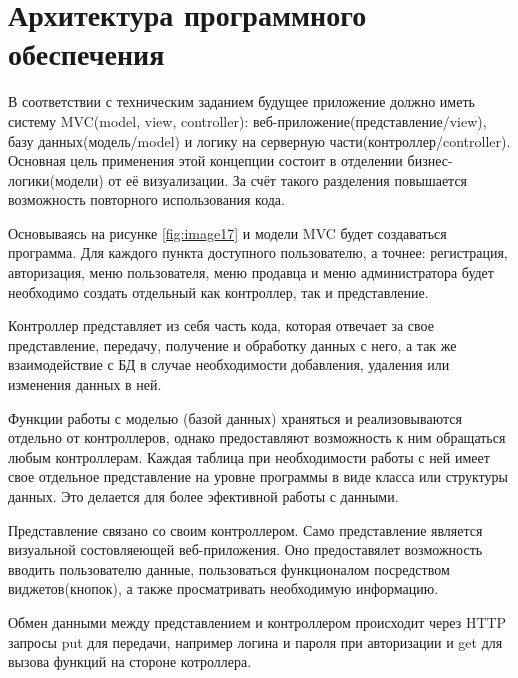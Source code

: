 \newpage

\section{Архитектура программного обеспечения}

\hspace{0cm} В соответствии с техническим заданием будущее приложение должно иметь систему MVC(model, view, controller): веб-приложение(представление/view), базу данных(модель/model) и логику на серверную части(контроллер/controller). Основная цель применения этой концепции состоит в отделении бизнес-логики(модели) от её визуализации. За счёт такого разделения повышается возможность повторного использования кода.

\hspace{0cm} Основываясь на рисунке \ref{fig:image17} и модели MVC будет создаваться программа. Для каждого пункта доступного пользователю, а точнее: регистрация, авторизация, меню пользователя, меню продавца и меню администратора будет необходимо создать отдельный как контроллер, так и представление.

\hspace{0cm} Контроллер представляет из себя часть кода, которая отвечает за свое представление, передачу, получение и обработку данных с него, а так же взаимодействие с БД в случае необходимости добавления, удаления или изменения данных в ней.

\hspace{0cm} Функции работы с моделью (базой данных) храняться и реализовываются отдельно от контроллеров, однако предоставляют возможность к ним обращаться любым контроллерам. Каждая таблица при необходимости работы с ней имеет свое отдельное представление на уровне программы в виде класса или структуры данных. Это делается для более эфективной работы с данными.

\hspace{0cm} Представление связано со своим контроллером. Само представление является визуальной состовляеющей веб-приложения. Оно предоставялет возможность вводить пользователю данные, пользоваться функционалом посредством виджетов(кнопок), а также просматривать необходимую информацию.

\hspace{0cm} Обмен данными между представлением и контроллером происходит через HTTP запросы put для передачи, например логина и пароля при авторизации и get для вызова функций на стороне котроллера.

